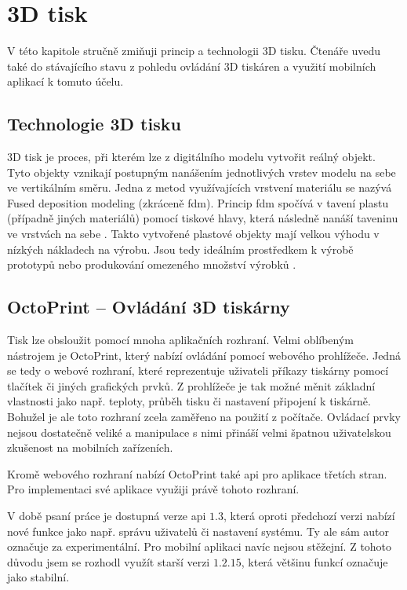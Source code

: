 \chapter{3D tisk}\label{3d-tisk}

V této kapitole stručně zmiňuji princip a technologii 3D tisku.
Čtenáře uvedu také do stávajícího stavu z pohledu ovládání 3D tiskáren a využití mobilních aplikací k tomuto účelu.

\section{Technologie 3D tisku}\label{3d-tisk-technologie}

3D tisk je proces, při kterém lze z digitálního modelu vytvořit reálný objekt.
Tyto objekty vznikají postupným nanášením jednotlivých vrstev modelu na sebe ve vertikálním směru.
Jedna z metod využívajících vrstvení materiálu se nazývá Fused deposition modeling (zkráceně \acrshort{fdm}).
Princip \acrshort{fdm} spočívá v tavení plastu (případně jiných materiálů) pomocí tiskové hlavy, která následně nanáší taveninu ve vrstvách na sebe \cite{3d-print-fdm}.
Takto vytvořené plastové objekty mají velkou výhodu v nízkých nákladech na výrobu.
Jsou tedy ideálním prostředkem k výrobě prototypů nebo produkování omezeného množství výrobků \cite{3d-print-for-prototyping}.

\section{OctoPrint -- Ovládání 3D tiskárny}\label{3d-tisk-ovladani}

Tisk lze obsloužit pomocí mnoha aplikačních rozhraní.
Velmi oblíbeným nástrojem je OctoPrint, který nabízí ovládání pomocí webového prohlížeče.
Jedná se tedy o webové rozhraní, které reprezentuje uživateli příkazy tiskárny pomocí tlačítek či jiných grafických prvků.
Z prohlížeče je tak možné měnit základní vlastnosti jako např. teploty, průběh tisku či nastavení připojení k tiskárně.
Bohužel je ale toto rozhraní zcela zaměřeno na použití z počítače.
Ovládací prvky nejsou dostatečně veliké a manipulace s nimi přináší velmi špatnou uživatelskou zkušenost na mobilních zařízeních.

Kromě webového rozhraní nabízí OctoPrint také \acrshort{api} pro aplikace třetích stran.
Pro implementaci své aplikace využiji právě tohoto rozhraní.

V době psaní práce je dostupná verze \gls{api} $1.3$, která oproti předchozí verzi nabízí nové funkce jako např. správu uživatelů či nastavení systému.
Ty ale sám autor označuje za experimentální.
Pro mobilní aplikaci navíc nejsou stěžejní.
Z tohoto důvodu jsem se rozhodl využít starší verzi $1.2.15$, která většinu funkcí označuje jako stabilní.

